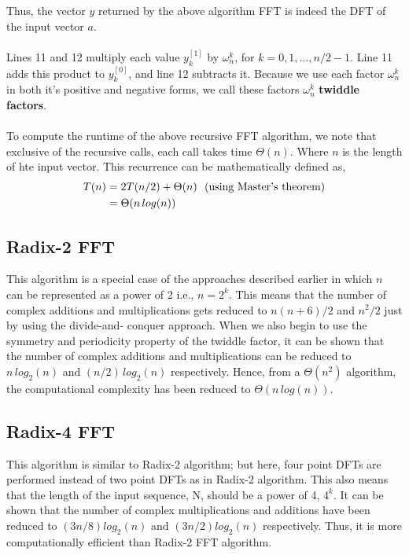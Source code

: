 \documentclass[preprint,12pt]{elsarticle}
\begin{document}
Thus, the vector $y$ returned by the above algorithm FFT is indeed the DFT of the input vector $a$. \\\\
Lines 11 and 12 multiply each value $y_k^{[1]}$ by $\omega^k_n$, for $k=0,1,...,n/2-1$. Line 11 adds this product to $y_k^{[0]}$, and line 12 subtracts it. Because we use each factor $\omega^k_n$ in both it's positive and negative forms, we call these factors $\omega^k_n$ \textbf{twiddle factors}.\\\\
To compute the runtime of the above recursive FFT algorithm, we note that exclusive of the recursive calls, each call takes time $\Theta(n)$. Where $n$ is the length of hte input vector. This recurrence can be mathematically defined as,
\begin{align*}
    T(n) &= 2T(n/2) + \Theta{(n)} \text{\,\,\,\,(using Master's theorem)} \\
    &= \Theta{(n\,log(n))}
\end{align*}

\newpage
\subsection{Radix-2 FFT}
This algorithm is a special case of the approaches described earlier in which $n$ can be represented as a power of 2 i.e., $n = 2^k$. This means that the number of complex additions and multiplications gets reduced to $n(n+6)/2$ and $n^2/2$ just by using the divide-and- conquer approach. When we also begin to use the symmetry and periodicity property of the twiddle factor, it can be shown that the number of complex additions and multiplications can be reduced to $n\,log_2(n)$ and $(n/2)\,log_2(n)$ respectively. Hence, from a $\Theta(n^2)$ algorithm, the computational complexity has been reduced to $\Theta(n\,log(n))$.


\subsection{Radix-4 FFT}
This algorithm is similar to Radix-2 algorithm; but here, four point DFTs are performed instead of two point DFTs as in Radix-2 algorithm. This also means that the length of the input sequence, N, should be a power of 4, $4^k$. It can be shown that the number of complex multiplications and additions have been reduced to $(3n/8)log_2(n)$ and $(3n/2)log_2(n)$ respectively. Thus, it is more computationally efficient than Radix-2 FFT algorithm.
\end{document}
